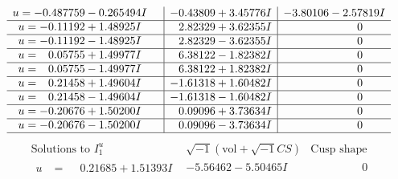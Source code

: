\documentclass[1p]{elsarticle_modified}
\theoremstyle{definition}
\newcommand{\I}{\sqrt{-1}}
\begin{document}
$$\begin{array}{c|c|c}
\begin{aligned}
u &= -0.487759 - 0.265494 I\end{aligned}
 & -0.43809 + 3.45776 I & -3.80106 - 2.57819 I \\ \hline\begin{aligned}
u &= -0.11192 + 1.48925 I\end{aligned}
 & \phantom{-}2.82329 + 3.62355 I & \phantom{-0.000000 } 0 \\ \hline\begin{aligned}
u &= -0.11192 - 1.48925 I\end{aligned}
 & \phantom{-}2.82329 - 3.62355 I & \phantom{-0.000000 } 0 \\ \hline\begin{aligned}
u &= \phantom{-}0.05755 + 1.49977 I\end{aligned}
 & \phantom{-}6.38122 - 1.82382 I & \phantom{-0.000000 } 0 \\ \hline\begin{aligned}
u &= \phantom{-}0.05755 - 1.49977 I\end{aligned}
 & \phantom{-}6.38122 + 1.82382 I & \phantom{-0.000000 } 0 \\ \hline\begin{aligned}
u &= \phantom{-}0.21458 + 1.49604 I\end{aligned}
 & -1.61318 + 1.60482 I & \phantom{-0.000000 } 0 \\ \hline\begin{aligned}
u &= \phantom{-}0.21458 - 1.49604 I\end{aligned}
 & -1.61318 - 1.60482 I & \phantom{-0.000000 } 0 \\ \hline\begin{aligned}
u &= -0.20676 + 1.50200 I\end{aligned}
 & \phantom{-}0.09096 + 3.73634 I & \phantom{-0.000000 } 0 \\ \hline\begin{aligned}
u &= -0.20676 - 1.50200 I\end{aligned}
 & \phantom{-}0.09096 - 3.73634 I & \phantom{-0.000000 } 0\\
 \hline 
 \end{array}$$\newpage$$\begin{array}{c|c|c}  
\text{Solutions to }I^u_{1}& \I (\text{vol} + \sqrt{-1}CS) & \text{Cusp shape}\\
 \hline 
\begin{aligned}
u &= \phantom{-}0.21685 + 1.51393 I\end{aligned}
 & -5.56462 - 5.50465 I & \phantom{-0.000000 } 0 \\ \hline\begin{aligned}

\end{aligned}
\end{array}$$
\end{document}
